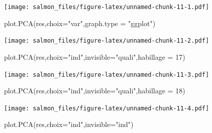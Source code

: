 \documentclass[
]{book}
\newenvironment{Shaded}{\begin{snugshade}}{\end{snugshade}}
\newcommand{\AttributeTok}[1]{\textcolor[rgb]{0.77,0.63,0.00}{#1}}
\newcommand{\DecValTok}[1]{\textcolor[rgb]{0.00,0.00,0.81}{#1}}
\newcommand{\FunctionTok}[1]{\textcolor[rgb]{0.00,0.00,0.00}{#1}}
\newcommand{\NormalTok}[1]{#1}
\newcommand{\OtherTok}[1]{\textcolor[rgb]{0.56,0.35,0.01}{#1}}
\newcommand{\SpecialCharTok}[1]{\textcolor[rgb]{0.00,0.00,0.00}{#1}}
\newcommand{\StringTok}[1]{\textcolor[rgb]{0.31,0.60,0.02}{#1}}
\begin{document}
\begin{Shaded}
\end{Shaded}

\texttt{[image: salmon\_files/figure-latex/unnamed-chunk-11-1.pdf]}

\begin{Shaded}
\begin{Highlighting}[]
\FunctionTok{plot.PCA}\NormalTok{(res,}\AttributeTok{choix=}\StringTok{"var"}\NormalTok{,}\AttributeTok{graph.type =} \StringTok{"ggplot"}\NormalTok{)}
\end{Highlighting}
\end{Shaded}

\texttt{[image: salmon\_files/figure-latex/unnamed-chunk-11-2.pdf]}

\begin{Shaded}
\begin{Highlighting}[]
\FunctionTok{plot.PCA}\NormalTok{(res,}\AttributeTok{choix=}\StringTok{"ind"}\NormalTok{,}\AttributeTok{invisible=}\StringTok{"quali"}\NormalTok{,}\AttributeTok{habillage =} \DecValTok{17}\NormalTok{)}
\end{Highlighting}
\end{Shaded}

\texttt{[image: salmon\_files/figure-latex/unnamed-chunk-11-3.pdf]}

\begin{Shaded}
\begin{Highlighting}[]
\FunctionTok{plot.PCA}\NormalTok{(res,}\AttributeTok{choix=}\StringTok{"ind"}\NormalTok{,}\AttributeTok{invisible=}\StringTok{"quali"}\NormalTok{,}\AttributeTok{habillage =} \DecValTok{18}\NormalTok{)}
\end{Highlighting}
\end{Shaded}

\texttt{[image: salmon\_files/figure-latex/unnamed-chunk-11-4.pdf]}

\begin{Shaded}
\begin{Highlighting}[]
\FunctionTok{plot.PCA}\NormalTok{(res,}\AttributeTok{choix=}\StringTok{"ind"}\NormalTok{,}\AttributeTok{invisible=}\StringTok{"ind"}\NormalTok{)}
\end{Highlighting}
\end{Shaded}
\end{document}
